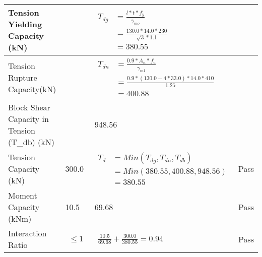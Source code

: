 \documentclass{article}%
\begin{document}
\begin{longtable}{|p{4cm}|p{5cm}|p{5.5cm}|p{1.5cm}|}
\hline%
Tension Yielding Capacity (kN)&&$\begin{aligned} T_{dg} &= \frac{l*t*f_y}{\gamma_{mo}}\\ &=\frac{130.0*14.0*230}{\sqrt{3}*1.1}\\ &=380.55\end{aligned}$&\\%
\hline%
Tension Rupture Capacity(kN)&&$\begin{aligned} T_{dn} &= \frac{0.9*A_{n}*f_u}{\gamma_{m1}}\\ &=\frac{0.9*(130.0-4*33.0)*14.0*410}{1.25}\\ &=400.88\end{aligned}$&\\%
\hline%
Block Shear Capacity in Tension (T\_db) (kN)&&948.56&\\%
\hline%
Tension Capacity (kN)&300.0&$\begin{aligned} T_d &= Min(T_{dg},T_{dn},T_{db})\\ &= Min(380.55,400.88,948.56)\\ &=380.55\end{aligned}$&Pass\\%
\hline%
Moment Capacity (kNm)&10.5&69.68&Pass\\%
\hline%
Interaction Ratio&$\begin{aligned} \leq1\end{aligned}$&$\begin{aligned} \frac{10.5}{69.68}+\frac{300.0}{380.55}=0.94\end{aligned}$&Pass\\%
\hline%
\end{longtable}

%
\end{document}
